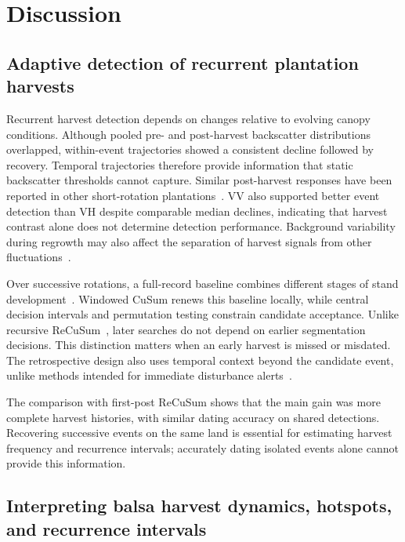 \section{Discussion}
\label{sec:discussion}

\subsection{Adaptive detection of recurrent plantation harvests}
\label{sec:discussion_local_adaptation}

Recurrent harvest detection depends on changes relative to evolving canopy conditions. Although pooled pre- and post-harvest backscatter distributions overlapped, within-event trajectories showed a consistent decline followed by recovery. Temporal trajectories therefore provide information that static backscatter thresholds cannot capture. Similar post-harvest responses have been reported in other short-rotation plantations~\citep{Spracklen2021Acacia}. VV also supported better event detection than VH despite comparable median declines, indicating that harvest contrast alone does not determine detection performance. Background variability during regrowth may also affect the separation of harvest signals from other fluctuations~\citep{Sabir2024AdaptiveCuSUM}.

Over successive rotations, a full-record baseline combines different stages of stand development~\citep{Kennedy2010LandTrendr}. Windowed CuSum renews this baseline locally, while central decision intervals and permutation testing constrain candidate acceptance. Unlike recursive ReCuSum~\citep{Ygorra2023ReCuSum}, later searches do not depend on earlier segmentation decisions. This distinction matters when an early harvest is missed or misdated. The retrospective design also uses temporal context beyond the candidate event, unlike methods intended for immediate disturbance alerts~\citep{Ygorra2024CuSumNRT}.

The comparison with first-post ReCuSum shows that the main gain was more complete harvest histories, with similar dating accuracy on shared detections. Recovering successive events on the same land is essential for estimating harvest frequency and recurrence intervals; accurately dating isolated events alone cannot provide this information.

\subsection{Interpreting balsa harvest dynamics, hotspots, and recurrence intervals}
\label{sec:discussion_harvest_histories}

